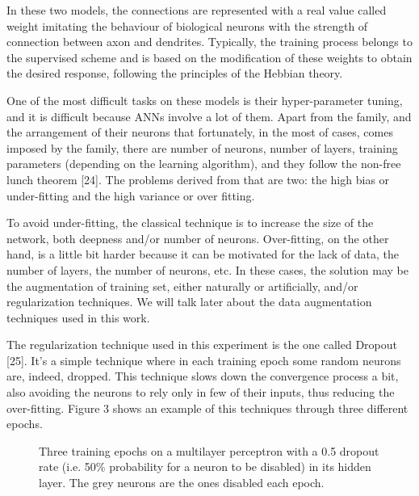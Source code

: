 In these two models, the connections are represented with a real value called weight imitating the behaviour of biological neurons with the strength of connection between axon and dendrites. Typically, the training process belongs to the supervised scheme and is based on the modification of these weights to obtain the desired response, following the principles of the Hebbian theory.

One of the most difficult tasks on these models is their hyper-parameter tuning, and it is difficult because ANNs involve a lot of them. Apart from the family, and the arrangement of their neurons that fortunately, in the most of cases, comes imposed by the family, there are number of neurons, number of layers, training parameters (depending on the learning algorithm), and they follow the non-free lunch theorem [24]. The problems derived from that are two: the high bias or under-fitting and the high variance or over fitting.

To avoid under-fitting, the classical technique is to increase the size of the network, both deepness and/or number of neurons. Over-fitting, on the other hand, is a little bit harder because it can be motivated for the lack of data, the number of layers, the number of neurons, etc. In these cases, the solution may be the augmentation of training set, either naturally or artificially, and/or regularization techniques. We will talk later about the data augmentation techniques used in this work.

The regularization technique used in this experiment is the one called Dropout [25]. It’s a simple technique where in each training epoch some random neurons are, indeed, dropped. This technique slows down the convergence process a bit, also avoiding the neurons to rely only in few of their inputs, thus reducing the over-fitting. Figure 3 shows an example of this techniques through three different epochs.

\begin{figure*}
	\centering
	\qquad
	\qquad
	\caption{Three training epochs on a multilayer perceptron with a 0.5 dropout rate (i.e. 50\% probability for a neuron to be disabled) in its hidden layer. The grey neurons are the ones disabled each epoch.}
	\label{fig:dropout-example}
\end{figure*}


